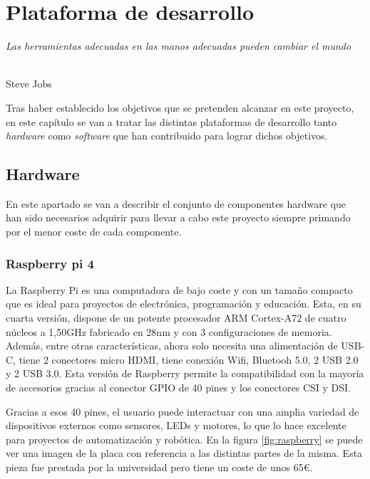 \chapter{Plataforma de desarrollo}
\label{cap:capitulo3}

\begin{flushright}
\begin{minipage}[]{10cm}
\emph{Las herramientas adecuadas en las manos adecuadas pueden cambiar el mundo}\\
\end{minipage}\\

Steve Jobs\\
\end{flushright}

\vspace{1cm}

Tras haber establecido los objetivos que se pretenden alcanzar en este proyecto, en este capítulo se van a tratar las distintas plataformas de desarrollo tanto \textit{hardware} como \textit{software} que han contribuido para lograr dichos objetivos.

\section{Hardware}

En este apartado se van a describir el conjunto de componentes hardware que han sido necesarios adquirir para llevar a cabo este proyecto siempre primando por el menor coste de cada componente.

\subsection{Raspberry pi 4}

La Raspberry Pi es una computadora de bajo coste y con un tamaño compacto que es ideal para proyectos de electrónica, programación y educación. Esta, en su cuarta versión, dispone de un potente procesador ARM Cortex-A72 de cuatro núcleos a 1,50GHz fabricado en 28nm y con 3 configuraciones de memoria. Además, entre otras características, ahora solo necesita una alimentación de USB-C, tiene 2 conectores micro HDMI, tiene conexión Wifi, Bluetooh 5.0, 2 USB 2.0 y 2 USB 3.0. Esta versión de Raspberry permite la compatibilidad con la mayoría de accesorios gracias al conector GPIO de 40 pines y los conectores CSI y DSI.

Gracias a esos 40 pines, el usuario puede interactuar con una amplia variedad de dispositivos externos como sensores, LEDs y motores, lo que lo hace excelente para proyectos de automatización y robótica. En la figura \ref{fig:raspberry} se puede ver una imagen de la placa con referencia a las distintas partes de la misma. Esta pieza fue prestada por la universidad pero tiene un coste de unos 65€. 


